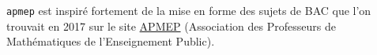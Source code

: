 %

\verb+apmep+ est inspiré fortement de la mise en forme des sujets de BAC que l'on trouvait en 2017 sur le site \href{https://www.apmep.fr}{APMEP} (Association des Professeurs de Mathématiques de l'Enseignement Public).
